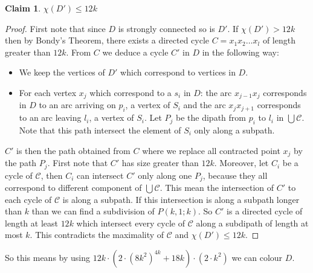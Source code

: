 \documentclass[utf8,11pt]{article}
\theoremstyle{plain}
\newtheorem{claim}{Claim}[theorem]
\theoremstyle{definition}
\theoremstyle{remark}
\newcommand{\dr}{ k^2}
\newcommand{\col}{(8k^2)^{4k}}
\begin{document}
\begin{claim}\label{cl:nocycle}
$\chi(D') \leq 12k$
\end{claim} 

\begin{proof}
First note that since $D$ is strongly connected so is $D'$. If $\chi(D') > 12k$ then by Bondy's Theorem, there exists
a directed cycle $C = x_1x_2 \dots x_l$ of length greater than $12k$. From $C$ we deduce a cycle $C'$ in $D$ in the following way: 
\begin{itemize}
	\item We keep the vertices of $D'$ which correspond to vertices in $D$.
	\item For each vertex $x_j$ which correspond to a $s_i$ in $D$: the arc $x_{j-1}x_j$ corresponds in $D$ to an arc arriving on 
		$p_i$, a vertex of $S_i$ and the arc $x_jx_{j+1}$ corresponds to an arc leaving $l_i$, a vertex of $S_i$. Let $P_j$ be the dipath 
		from $p_i$ to $l_i$ in $\bigcup \mathcal{C}$. Note that this path intersect the element of $S_i$ only along a subpath. 
\end{itemize}
$C'$ is then the path obtained from $C$ where we replace all contracted point $x_j$ by the path $P_j$. 
First note that $C'$ has size greater than $12k$. Moreover, let $C_i$ be a cycle of $\mathcal{C}$, then $C_i$ can
intersect $C'$ only along one $P_j$, because they all correspond to different component of $\bigcup \mathcal{C}$. This mean the
intersection of $C'$ to each cycle of $\mathcal{C}$ is along a subpath. If this intersection is along a subpath longer than $k$ than we can 
find a subdivision of $P(k,1;k)$. So $C'$ is a directed cycle of length at least $12k$ which intersect every cycle of $\mathcal{C}$ along a 
subdipath of length at most $k$. This contradicts the maximality of $\mathcal{C}$ and $\chi(D') \leq 12k$.
\end{proof}


So this means by using $12k \cdot (2\cdot \col + 18k) \cdot (2 \cdot \dr)$ we can colour $D$.
\end{document}
